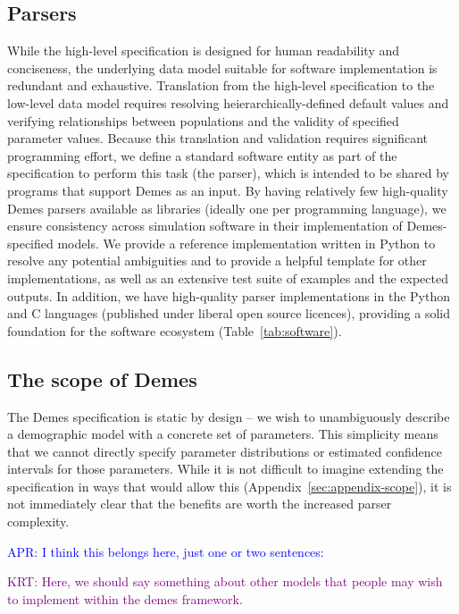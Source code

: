 \documentclass[11pt]{article}
\newcommand{\aprcomment}[1]{{\textcolor{blue}{APR: #1}}}
\newcommand{\krtcomment}[1]{{\textcolor{purple}{KRT: #1}}}
\begin{document}
\subsection*{Parsers}

While the high-level specification is designed for human readability and
conciseness, the underlying data model suitable for software implementation
is redundant and exhaustive. 
Translation from the high-level specification to the low-level data model
requires resolving heierarchically-defined default values and verifying
relationships between populations and the validity of specified parameter
values.
Because this translation and validation requires significant
programming effort, we define a standard software entity as part of the
specification to perform this task (the parser),
which is intended to be shared by programs that support Demes as an input.
By having relatively few high-quality Demes parsers available as libraries
(ideally one per programming language), we ensure consistency across simulation
software in their implementation of Demes-specified models.
We provide a reference implementation written in Python to resolve any
potential ambiguities and to provide a helpful template for other
implementations, as well as an extensive test suite of examples and the
expected outputs.
In addition, we have high-quality parser implementations in the Python and
C languages (published under liberal open source licences), providing a
solid foundation for the software ecosystem (Table~\ref{tab:software}).

\subsection*{The scope of Demes}

The Demes specification is static by design -- we wish to unambiguously
describe a demographic model with a concrete set of parameters.
This simplicity means that we cannot directly specify parameter distributions
or estimated confidence intervals for those parameters.
While it is not difficult to imagine extending the specification in ways that
would allow this (Appendix~\ref{sec:appendix-scope}), it is not immediately
clear that the benefits are worth the increased parser complexity.

\aprcomment{I think this belongs here, just one or two sentences:}

\krtcomment{Here, we should say something about other models that people may wish to implement within the demes
framework.}
\end{document}
